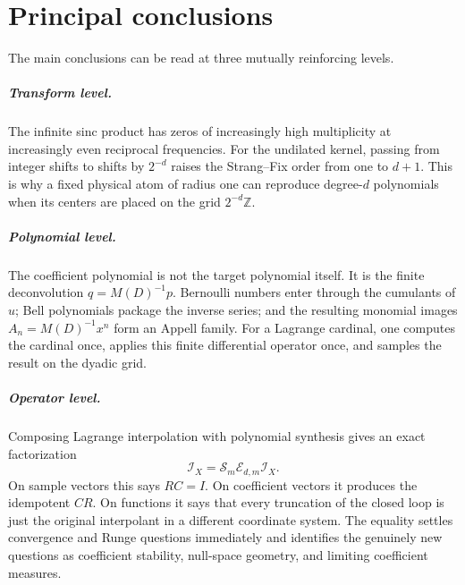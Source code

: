 \documentclass[11pt,oneside]{book}
\theoremstyle{definition}
\theoremstyle{remark}
\newcommand{\Z}{\mathbb Z}
\newcommand{\Iop}{\mathcal I}
\newcommand{\Sop}{\mathcal S}
\newcommand{\Eop}{\mathcal E}
\begin{document}
\begin{abstract}
For a convergent nested or telescoping Lagrange expansion, the substitution yields a level-grouped double series of shifted copies of \(u\), and its partial sum through level \(N\) is precisely \(\mathcal I_Nu\).  The report develops this identity, proves the collocation and projector results, derives explicit dyadic inter-level null vectors, gives low-degree closed forms, reports numerical checks, and formulates several conjectures about coefficient measures, asymptotic obliquity, and stable node families.  Claims described as ``new in this report'' mean that they were not found in the recursively scanned repository corpus; no claim of priority over the entire external literature is intended.
\end{abstract}

\tableofcontents
\listoftables
\listoffigures

\chapter*{Principal conclusions}
The main conclusions can be read at three mutually reinforcing levels.

\paragraph{Transform level.}
The infinite sinc product has zeros of increasingly high multiplicity at increasingly even reciprocal frequencies.  For the undilated kernel, passing from integer shifts to shifts by \(2^{-d}\) raises the Strang--Fix order from one to \(d+1\).  This is why a fixed physical atom of radius one can reproduce degree-\(d\) polynomials when its centers are placed on the grid \(2^{-d}\Z\).

\paragraph{Polynomial level.}
The coefficient polynomial is not the target polynomial itself.  It is the finite deconvolution \(q=M(D)^{-1}p\).  Bernoulli numbers enter through the cumulants of \(u\); Bell polynomials package the inverse series; and the resulting monomial images \(A_n=M(D)^{-1}x^n\) form an Appell family.  For a Lagrange cardinal, one computes the cardinal once, applies this finite differential operator once, and samples the result on the dyadic grid.

\paragraph{Operator level.}
Composing Lagrange interpolation with polynomial synthesis gives an exact factorization
\[
   \Iop_X=\Sop_m\Eop_{d,m}\Iop_X.
\]
On sample vectors this says \(RC=I\).  On coefficient vectors it produces the idempotent \(CR\).  On functions it says that every truncation of the closed loop is just the original interpolant in a different coordinate system.  The equality settles convergence and Runge questions immediately and identifies the genuinely new questions as coefficient stability, null-space geometry, and limiting coefficient measures.
\end{document}
